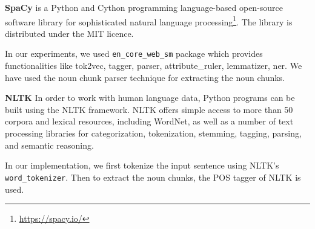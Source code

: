 \documentclass[11pt]{article}
\renewcommand{\paragraph}[1]{\vspace{1mm}\noindent\textbf{#1}}
\begin{document}
\paragraph{SpaCy}
is a Python and Cython programming language-based open-source software library for sophisticated natural language processing\footnote{\url{https://spacy.io/}}.
The library is distributed under the MIT licence.

In our experiments, we used \texttt{en\_core\_web\_sm} package which provides functionalities like tok2vec, tagger, parser, attribute\_ruler, lemmatizer, ner. We have used the noun chunk parser technique for extracting the noun chunks.

\paragraph{NLTK}
In order to work with human language data, Python programs can be built using the NLTK framework.
NLTK offers simple access to more than 50 corpora and lexical resources, including WordNet, as well as a number of text processing libraries for categorization, tokenization, stemming, tagging, parsing, and semantic reasoning.

In our implementation, we first tokenize the input sentence using NLTK's \texttt{word\_tokenizer}.
Then to extract the noun chunks, the POS tagger of NLTK is used.
\end{document}
